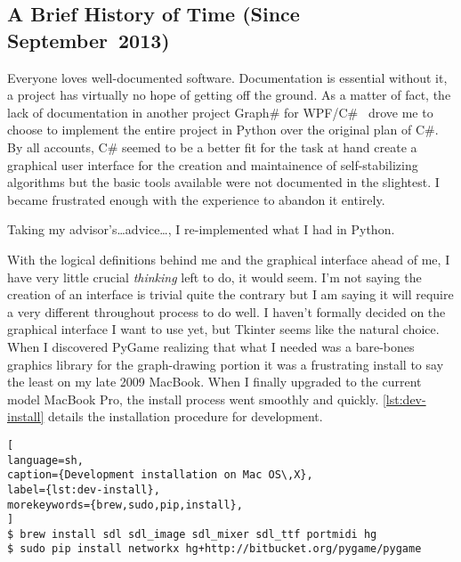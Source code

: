 \subsection{A Brief History of Time (Since September~2013)}
Everyone loves well-documented software.
Documentation is essential \Dash without it, a project has virtually no hope of getting off the ground.
As a matter of fact, the lack of documentation in another project \Dash
  Graph\# for WPF/C\#~\autocite{palesz:graphsharp} \Dash
  drove me to choose to implement the entire project in Python over the original plan of C\#.
By all accounts, C\# seemed to be a better fit for the task at hand \Dash
  create a graphical user interface for the creation and maintainence of self-stabilizing algorithms \Dash
  but the basic tools available were not documented in the slightest.
I became frustrated enough with the experience to abandon it entirely.

Taking my advisor's\dots advice\dots, I re-implemented what I had in Python.

\bigskip

With the logical definitions behind me and the graphical interface ahead of me,
  I have very little crucial \emph{thinking} left to do, it would seem.
I'm not saying the creation of an interface is trivial \Dash quite the contrary \Dash
  but I am saying it will require a very different throughout process to do well.
I haven't formally decided on the graphical interface I want to use yet, but Tkinter seems like the natural choice.
When I discovered PyGame \Dash realizing that what I needed was
  a bare-bones graphics library for the graph-drawing portion \Dash
  it was a frustrating install to say the least on my late 2009 MacBook.
When I finally upgraded to the current model MacBook Pro,
  the install process went smoothly and quickly.
\autoref{lst:dev-install} details the installation procedure for development.

\begin{lstlisting}[
language=sh,
caption={Development installation on Mac OS\,X},
label={lst:dev-install},
morekeywords={brew,sudo,pip,install},
]
$ brew install sdl sdl_image sdl_mixer sdl_ttf portmidi hg
$ sudo pip install networkx hg+http://bitbucket.org/pygame/pygame
\end{lstlisting}

